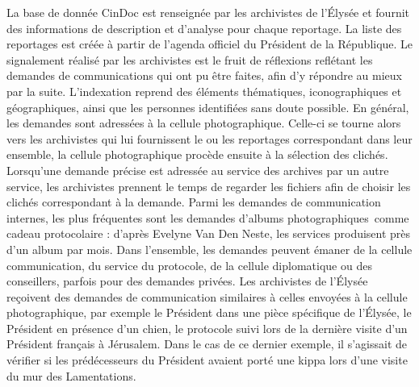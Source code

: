 La base de donnée CinDoc est renseignée par les archivistes de l’Élysée et fournit des informations de description et d’analyse pour chaque reportage. La liste des reportages est créée à partir de l’agenda officiel du Président de la République.  Le signalement réalisé par les archivistes est le fruit de réflexions reflétant les demandes de communications qui ont pu être faites, afin d’y répondre au mieux par la suite. L’indexation reprend des éléments thématiques, iconographiques et géographiques, ainsi que les personnes identifiées sans doute possible. En général, les demandes sont adressées à la cellule photographique. Celle-ci se tourne alors vers les archivistes qui lui fournissent le ou les reportages correspondant dans leur ensemble, la cellule photographique procède ensuite à la sélection des clichés. Lorsqu’une demande précise est adressée au service des archives par un autre service, les archivistes prennent le temps de regarder les fichiers afin de choisir les clichés correspondant à la demande. Parmi les demandes de communication internes, les plus fréquentes sont les demandes d’albums photographiques comme cadeau protocolaire : d’après Evelyne Van Den Neste, les services produisent près d’un album par mois. Dans l’ensemble, les demandes peuvent émaner de la cellule communication, du service du protocole, de la cellule diplomatique ou des conseillers, parfois pour des demandes privées. Les archivistes de l’Élysée reçoivent des demandes de communication similaires à celles envoyées à la cellule photographique, par exemple le Président dans une pièce spécifique de l’Élysée, le Président en présence d’un chien, le protocole suivi lors de la dernière visite d’un Président français à Jérusalem. Dans le cas de ce dernier exemple, il s’agissait de vérifier si les prédécesseurs du Président avaient porté une kippa lors d’une visite du mur des Lamentations.

